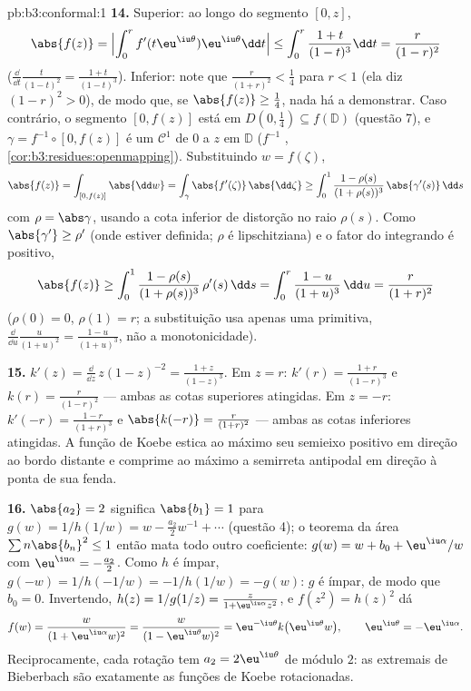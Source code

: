 \begin{solution}{pb:b3:conformal:1}
\textbf{14.} Superior: ao longo do segmento $[0, z]$,
\[
\abs{f(z)} = \Bigl|\int_0^rf'(t\eu^{\iu\theta})
\eu^{\iu\theta}\dd t\Bigr|
\leq \int_0^r\frac{1+t}{(1-t)^3}\dd t
= \frac{r}{(1-r)^2}
\]
($\frac{\dd}{\dd t}\frac t{(1-t)^2} = \frac{1+t}{(1-t)^3}$).
Inferior: note que $\frac r{(1+r)^2} < \frac14$ para $r < 1$ (ela
diz $(1-r)^2 > 0$), de modo que, se $\abs{f(z)} \geq \frac14$, nada há
a demonstrar. Caso contrário, o segmento $[0, f(z)]$ está
em $D(0, \frac14) \subseteq f(\mathbb D)$ (questão 7), e
$\gamma = f^{-1}\circ[0, f(z)]$ é um  $\mathcal C^1$
de $0$ a $z$ em $\mathbb D$ ($f^{-1}$ ,
\cref{cor:b3:residues:openmapping}). Substituindo $w =
f(\zeta)$,
\[
\abs{f(z)} = \int_{[0,f(z)]}\abs{\dd w}
= \int_\gamma\abs{f'(\zeta)}\,\abs{\dd\zeta}
\geq \int_0^1\frac{1 - \rho(s)}{(1 + \rho(s))^3}
\,\abs{\gamma'(s)}\,\dd s
\]
com $\rho = \abs\gamma$, usando a cota inferior de distorção
no raio $\rho(s)$. Como $\abs{\gamma'} \geq \rho'$
(onde estiver definida; $\rho$ é lipschitziana) e o fator do integrando
é positivo,
\[
\abs{f(z)} \geq \int_0^1
\frac{1 - \rho(s)}{(1 + \rho(s))^3}\,\rho'(s)\,\dd s
= \int_0^{r}\frac{1 - u}{(1 + u)^3}\,\dd u
= \frac{r}{(1 + r)^2}
\]
($\rho(0) = 0$, $\rho(1) = r$; a substituição usa apenas uma
primitiva, $\frac{\dd}{\dd u}\frac u{(1+u)^2} =
\frac{1-u}{(1+u)^3}$, não a monotonicidade).

\textbf{15.} $k'(z) = \frac{\dd}{\dd z}\,z(1 - z)^{-2} =
\frac{1 + z}{(1 - z)^3}$. Em $z = r$: $k'(r) =
\frac{1+r}{(1-r)^3}$ e $k(r) = \frac r{(1-r)^2}$ --- ambas as
cotas superiores atingidas. Em $z = -r$: $k'(-r) =
\frac{1-r}{(1+r)^3}$ e $\abs{k(-r)} = \frac r{(1+r)^2}$
--- ambas as cotas inferiores atingidas. A função de Koebe estica
ao máximo seu semieixo positivo em direção ao bordo distante e
comprime ao máximo a semirreta antipodal em direção à ponta de sua
fenda.

\textbf{16.} $\abs{a_2} = 2$ significa $\abs{b_1} = 1$ para $g(w)
= 1/h(1/w) = w - \frac{a_2}2w^{-1} + \cdots$ (questão 4);
o teorema da área $\sum n\abs{b_n}^2 \leq 1$ então mata todo
outro coeficiente: $g(w) = w + b_0 + \eu^{\iu\alpha}/w$ com
$\eu^{\iu\alpha} = -\frac{a_2}2$. Como $h$ é ímpar, $g(-w) =
1/h(-1/w) = -1/h(1/w) = -g(w)$: $g$ é ímpar, de modo que $b_0 = 0$.
Invertendo, $h(z) = 1/g(1/z) = \frac{z}{1 +
\eu^{\iu\alpha}z^2}$, e $f(z^2) = h(z)^2$ dá
\[
f(w) = \frac{w}{(1 + \eu^{\iu\alpha}w)^2}
= \frac{w}{(1 - \eu^{\iu\theta}w)^2}
= \eu^{-\iu\theta}k\bigl(\eu^{\iu\theta}w\bigr),
\qquad \eu^{\iu\theta} = -\eu^{\iu\alpha} .
\]
Reciprocamente, cada rotação tem $a_2 = 2\eu^{\iu\theta}$ de
módulo $2$: as extremais de Bieberbach são exatamente as
funções de Koebe rotacionadas.


\end{solution}
